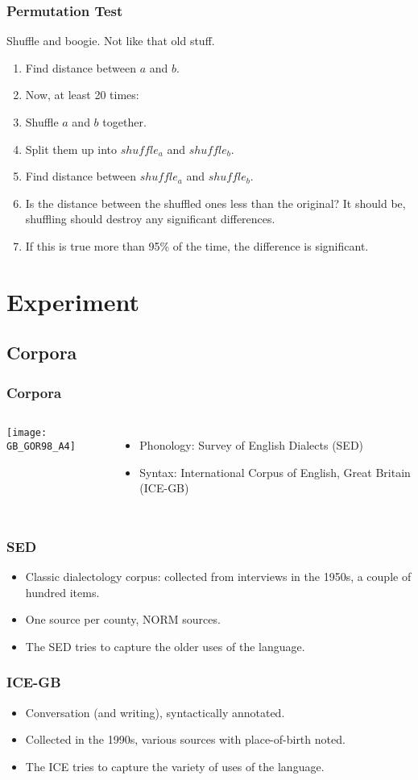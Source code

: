 \documentclass{beamer}
\begin{document}
\begin{frame}
  \frametitle{Permutation Test}
  Shuffle and boogie. Not like that old stuff.
  \begin{enumerate}
  \item Find distance between $a$ and $b$.
  \item Now, at least 20 times:
  \item Shuffle $a$ and $b$ together.
  \item Split them up into $shuffle_a$ and $shuffle_b$.
  \item Find distance between $shuffle_a$ and $shuffle_b$.
  \item Is the distance between the shuffled ones less than the
    original? It should be, shuffling should destroy any significant differences.
  \item If this is true more than 95\% of the time, the difference is
    significant.
  \end{enumerate}
\end{frame}
\section{Experiment}
\subsection{Corpora}
\begin{frame}
  \frametitle{Corpora}
  \begin{columns}
  \texttt{[image: GB\_GOR98\_A4]}
  \begin{itemize}
  \item Phonology: Survey of English Dialects (SED)
  \item Syntax: International Corpus of English, Great Britain
    (ICE-GB)
  \end{itemize}
    \end{columns}
\end{frame}
\begin{frame}
  \frametitle{SED}
  \begin{itemize}
  \item Classic dialectology corpus: collected from interviews in the
    1950s, a couple of hundred items.
  \item One source per county, NORM sources.
  \item The SED tries to capture the older uses of the language.
  \end{itemize}
\end{frame}
\begin{frame}
  \frametitle{ICE-GB}
  \begin{itemize}
  \item Conversation (and writing), syntactically annotated.
  \item Collected in the 1990s, various sources with place-of-birth noted.
  \item The ICE tries to capture the variety of uses of the
    language.
  \end{itemize}
\end{frame}
\end{document}
